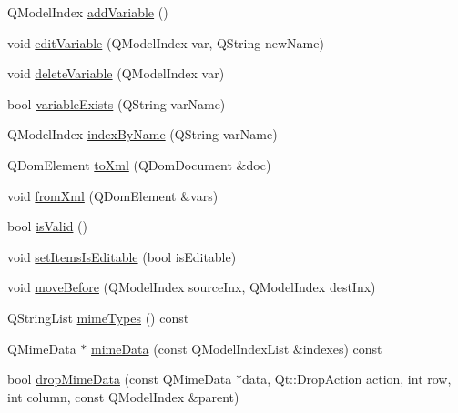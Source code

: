 \begin{DoxyCompactItemize}
\item 
QModelIndex \hyperlink{class_var_model_a586a23e5bb50540df8c292e77e64c5a9}{addVariable} ()
\item 
void \hyperlink{class_var_model_a3973f339d324f7256829e4def1308ee3}{editVariable} (QModelIndex var, QString newName)
\item 
void \hyperlink{class_var_model_ab89a41e941738401c7f904e93b7a6b85}{deleteVariable} (QModelIndex var)
\item 
bool \hyperlink{class_var_model_a5e1033c4372f921f923b5e5d5c98cdc5}{variableExists} (QString varName)
\item 
QModelIndex \hyperlink{class_var_model_ae580c89f8c8c36ae58321ba84a78122d}{indexByName} (QString varName)
\item 
QDomElement \hyperlink{class_var_model_a689f705b5d6b7b73b45891cdaaf996c9}{toXml} (QDomDocument \&doc)
\item 
void \hyperlink{class_var_model_aeefb24afb52490c61094c73ac3b6c1cd}{fromXml} (QDomElement \&vars)
\item 
bool \hyperlink{class_var_model_ac42474c690971bb607aa5fb2b91c7283}{isValid} ()
\item 
void \hyperlink{class_var_model_a9b2c7fc75dab534bb88ac2d467756975}{setItemsIsEditable} (bool isEditable)
\item 
void \hyperlink{class_var_model_a16819eda35dd6f9ca4de1d7e80c424fa}{moveBefore} (QModelIndex sourceInx, QModelIndex destInx)
\item 
QStringList \hyperlink{class_var_model_ab8c9c99df19a36bee3d2ac2f5660fa30}{mimeTypes} () const 
\item 
QMimeData $\ast$ \hyperlink{class_var_model_a0a250e6ce31866a2b6b363b495942197}{mimeData} (const QModelIndexList \&indexes) const 
\item 
bool \hyperlink{class_var_model_aeda241f2b8d9de1fdabc2de12c46d697}{dropMimeData} (const QMimeData $\ast$data, Qt::DropAction action, int row, int column, const QModelIndex \&parent)
\end{DoxyCompactItemize}


